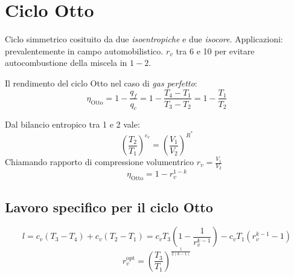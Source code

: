 \section{Ciclo Otto}
Ciclo simmetrico cosituito da due \emph{isoentropiche} e due \emph{isocore}.
Applicazioni: prevalentemente in campo automobilistico. $r_v$ tra 6 e 10 per evitare autocombustione della miscela in $1-2$.

\begin{minipage}{.5\linewidth}
    \end{minipage}%
    \begin{minipage}{.5\linewidth}
\end{minipage}

Il rendimento del ciclo Otto nel caso di \emph{gas perfetto}:
\[
    \eta_{\text{Otto}} = 1 - \frac{q_f}{q_c} = 1 - \frac{T_4-T_1}{T_3-T_2} = 1 - \frac{T_1}{T_2}
\]

Dal bilancio entropico tra 1 e 2 vale:
\[
    \left( \frac{T_2}{T_1} \right)^{c_v} = \left( \frac{V_1}{V_2} \right)^{R^*} 
\]
Chiamando rapporto di compressione volumentrico $r_v = \frac{V_1}{V_2}$
\[
    \eta_{\text{Otto}} = 1 - r_v^{1-k}
\]

\subsection{Lavoro specifico per il ciclo Otto}
\[
    l = c_v(T_3-T_4) + c_v(T_2-T_1) = c_vT_3\left(1-\frac{1}{r_v^{k-1}}\right) - c_vT_1(r_v^{k-1}-1)
\]
\[
    r_v^{\text{opt}} = \left(\frac{T_3}{T_1}\right)^{\frac{1}{2(k-1)}}
\]
